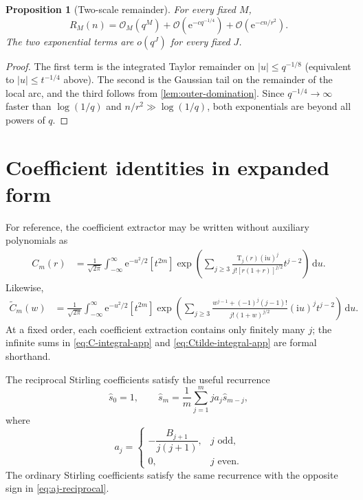 \documentclass[11pt,a4paper]{article}
\newtheorem{proposition}[theorem]{Proposition}
\theoremstyle{definition}
\newcommand{\Touch}{\mathrm T}
\newcommand{\ee}{\mathrm e}
\newcommand{\ii}{\mathrm i}
\newcommand{\dd}{\,\mathrm d}
\newcommand{\bigO}{\mathcal O}
\newcommand{\smallo}{o}
\begin{document}
\begin{proposition}[Two-scale remainder]\label{prop:two-scale-rem}
For every fixed $M$,
\begin{equation}\label{eq:two-scale-rem}
 R_M(n)=\bigO_M(q^M)
 +\bigO\!\left(\ee^{-c q^{-1/4}}\right)
 +\bigO\!\left(\ee^{-c n/r^2}\right).
\end{equation}
The two exponential terms are $\smallo(q^J)$ for every fixed $J$.
\end{proposition}

\begin{proof}
The first term is the integrated Taylor remainder on
$|u|\le q^{-1/8}$ (equivalent to $|u|\le t^{-1/4}$ above).  The second is the
Gaussian tail on the remainder of the local arc, and the third follows from
\cref{lem:outer-domination}.  Since
$q^{-1/4}\to\infty$ faster than $\log(1/q)$ and
$n/r^2\gg\log(1/q)$, both exponentials are beyond all powers of $q$.
\end{proof}

\section{Coefficient identities in expanded form}

For reference, the coefficient extractor may be written without auxiliary
polynomials as
\begin{align}
 C_m(r)
 &=\frac1{\sqrt{2\pi}}\int_{-\infty}^{\infty}
 \ee^{-u^2/2}
 [t^{2m}]\exp\!\left(
 \sum_{j\ge3}
 \frac{\Touch_j(r)(\ii u)^j}{j![r(1+r)]^{j/2}}t^{j-2}
 \right)\dd u.\label{eq:C-integral-app}
\end{align}
Likewise,
\begin{align}
 \widetilde C_m(w)
 &=\frac1{\sqrt{2\pi}}\int_{-\infty}^{\infty}
 \ee^{-u^2/2}
 [t^{2m}]\exp\!\left(
 \sum_{j\ge3}
 \frac{w^{j-1}+(-1)^j(j-1)!}
 {j!(1+w)^{j/2}}(\ii u)^jt^{j-2}
 \right)\dd u.\label{eq:Ctilde-integral-app}
\end{align}
At a fixed order, each coefficient extraction contains only finitely many
$j$; the infinite sums in \eqref{eq:C-integral-app} and
\eqref{eq:Ctilde-integral-app} are formal shorthand.

The reciprocal Stirling coefficients satisfy the useful recurrence
\begin{equation}\label{eq:reciprocal-stirling-recurrence}
 \widehat s_0=1,
 \qquad
 \widehat s_m=\frac1m\sum_{j=1}^{m}j a_j\widehat s_{m-j},
\end{equation}
where
\begin{equation}\label{eq:aj-reciprocal}
 a_j=
 \begin{cases}
 -\dfrac{B_{j+1}}{j(j+1)},&j\text{ odd},\\[0.6em]
 0,&j\text{ even}.
 \end{cases}
\end{equation}
The ordinary Stirling coefficients satisfy the same recurrence with the
opposite sign in \eqref{eq:aj-reciprocal}.
\end{document}
